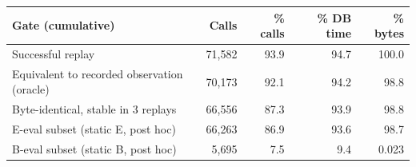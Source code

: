 \begin{tabular}{@{}L{3.15cm}rrrr@{}}
\toprule
Gate (cumulative) & Calls & \% calls & \% DB time & \% bytes \\
\midrule
Successful replay & 71,582 & 93.9 & 94.7 & 100.0 \\
Equivalent to recorded observation (oracle) & 70,173 & 92.1 & 94.2 & 98.8 \\
Byte-identical, stable in 3 replays & 66,556 & 87.3 & 93.9 & 98.8 \\
E-eval subset (static E, post hoc) & 66,263 & 86.9 & 93.6 & 98.7 \\
B-eval subset (static B, post hoc) & 5,695 & 7.5 & 9.4 & 0.023 \\
\bottomrule
\end{tabular}
